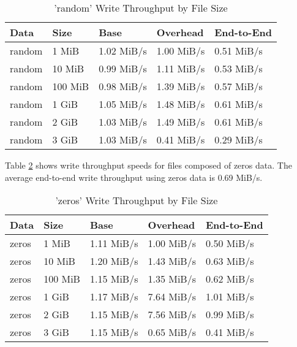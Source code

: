 \documentclass[11pt]{article}
\begin{document}
\begin{table}
  \begin{center}
    \begin{tabularx}{\textwidth}{|X|X|X|X|X|}
      \hline
      {\bf Data} & {\bf Size} & {\bf Base} & {\bf Overhead} & {\bf End-to-End} \\ \hline
      random & 1 MiB & 1.02 MiB/s & 1.00 MiB/s & 0.51 MiB/s \\ \hline
      random & 10 MiB & 0.99 MiB/s & 1.11 MiB/s & 0.53 MiB/s \\ \hline
      random & 100 MiB & 0.98 MiB/s & 1.39 MiB/s & 0.57 MiB/s \\ \hline
      random & 1 GiB & 1.05 MiB/s & 1.48 MiB/s & 0.61 MiB/s \\ \hline
      random & 2 GiB & 1.03 MiB/s & 1.49 MiB/s & 0.61 MiB/s \\ \hline
      random & 3 GiB & 1.03 MiB/s & 0.41 MiB/s & 0.29 MiB/s \\ \hline
    \end{tabularx}
    \caption{'random' Write Throughput by File Size}
    \label{tbl:TahoeWriteRandom}
  \end{center}
\end{table}

Table \ref{tbl:TahoeWriteZeros} shows write throughput speeds for files
composed of zeros data. The average end-to-end write throughput using
zeros data is 0.69 MiB/s.

\begin{table}
  \begin{center}
    \begin{tabularx}{\textwidth}{|X|X|X|X|X|}
      \hline
      {\bf Data} & {\bf Size} & {\bf Base} & {\bf Overhead} & {\bf End-to-End} \\ \hline
      zeros & 1 MiB & 1.11 MiB/s & 1.00 MiB/s & 0.50 MiB/s \\ \hline
      zeros & 10 MiB & 1.20 MiB/s & 1.43 MiB/s & 0.63 MiB/s \\ \hline
      zeros & 100 MiB & 1.15 MiB/s & 1.35 MiB/s & 0.62 MiB/s \\ \hline
      zeros & 1 GiB & 1.17 MiB/s & 7.64 MiB/s & 1.01 MiB/s \\ \hline
      zeros & 2 GiB & 1.15 MiB/s & 7.56 MiB/s & 0.99 MiB/s \\ \hline
      zeros & 3 GiB & 1.15 MiB/s & 0.65 MiB/s & 0.41 MiB/s \\ \hline
    \end{tabularx}
    \caption{'zeros' Write Throughput by File Size}
    \label{tbl:TahoeWriteZeros}
  \end{center}
\end{table}
\end{document}
